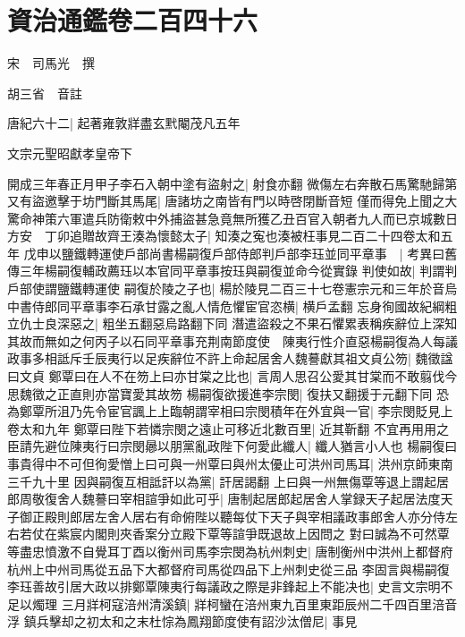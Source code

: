 \section{資治通鑑卷二百四十六}
宋　司馬光　撰

胡三省　音註

唐紀六十二|{
	起著雍敦牂盡玄黓閹茂凡五年}


文宗元聖昭獻孝皇帝下

開成三年春正月甲子李石入朝中塗有盜射之|{
	射食亦翻}
微傷左右奔散石馬驚馳歸第又有盜邀擊于坊門斷其馬尾|{
	唐諸坊之南皆有門以時啓閉斷音短}
僅而得免上聞之大驚命神策六軍遣兵防衛敕中外捕盜甚急竟無所獲乙丑百官入朝者九人而已京城數日方安　丁卯追贈故齊王湊為懷懿太子|{
	知湊之寃也湊被枉事見二百二十四卷太和五年}
戊申以鹽鐵轉運使戶部尚書楊嗣復戶部侍郎判戶部李珏並同平章事　|{
	考異曰舊傳三年楊嗣復輔政薦珏以本官同平章事按珏與嗣復並命今從實錄}
判使如故|{
	判謂判戶部使謂鹽鐵轉運使}
嗣復於陵之子也|{
	楊於陵見二百三十七卷憲宗元和三年於音烏}
中書侍郎同平章事李石承甘露之亂人情危懼宦官恣横|{
	横戶孟翻}
忘身徇國故紀綱粗立仇士良深惡之|{
	粗坐五翻惡烏路翻下同}
潛遣盜殺之不果石懼累表稱疾辭位上深知其故而無如之何丙子以石同平章事充荆南節度使　陳夷行性介直惡楊嗣復為人每議政事多相詆斥壬辰夷行以足疾辭位不許上命起居舍人魏謩獻其祖文貞公笏|{
	魏徵諡曰文貞}
鄭覃曰在人不在笏上曰亦甘棠之比也|{
	言周人思召公愛其甘棠而不敢翦伐今思魏徵之正直則亦當寶愛其故笏}
楊嗣復欲援進李宗閔|{
	復扶又翻援于元翻下同}
恐為鄭覃所沮乃先令宦官諷上上臨朝謂宰相曰宗閔積年在外宜與一官|{
	李宗閔貶見上卷太和九年}
鄭覃曰陛下若憐宗閔之遠止可移近北數百里|{
	近其靳翻}
不宜再用用之臣請先避位陳夷行曰宗閔曏以朋黨亂政陛下何愛此纖人|{
	纖人猶言小人也}
楊嗣復曰事貴得中不可但徇愛憎上曰可與一州覃曰與州太優止可洪州司馬耳|{
	洪州京師東南三千九十里}
因與嗣復互相詆訐以為黨|{
	訐居謁翻}
上曰與一州無傷覃等退上謂起居郎周敬復舍人魏謩曰宰相諠爭如此可乎|{
	唐制起居郎起居舍人掌録天子起居法度天子御正殿則郎居左舍人居右有命俯陛以聽每仗下天子與宰相議政事郎舍人亦分侍左右若仗在紫宸内閣則夾香案分立殿下覃等諠爭既退故上因問之}
對曰誠為不可然覃等盡忠憤激不自覺耳丁酉以衡州司馬李宗閔為杭州刺史|{
	唐制衡州中洪州上都督府杭州上中州司馬從五品下大都督府司馬從四品下上州刺史從三品}
李固言與楊嗣復李珏善故引居大政以排鄭覃陳夷行每議政之際是非鋒起上不能决也|{
	史言文宗明不足以燭理}
三月牂柯寇涪州清溪鎮|{
	牂柯蠻在涪州東九百里東距辰州二千四百里涪音浮}
鎮兵擊却之初太和之末杜悰為鳳翔節度使有詔沙汰僧尼|{
	事見}


